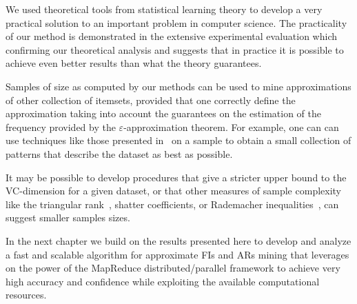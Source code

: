 We used theoretical tools from statistical learning theory to develop a very
practical solution to an important problem in computer science. The practicality
of our method is demonstrated in the extensive experimental evaluation which
confirming our theoretical analysis and suggests that in practice it is possible
to achieve even better results than what the theory guarantees. 

Samples of size as computed by our methods can be used to mine approximations
of other collection of itemsets, provided that one correctly define the
approximation taking into account the guarantees on the estimation of the
frequency provided by the $\varepsilon$-approximation theorem. For example, one
can can use techniques like those presented in~\citep{MampaeyTV11} on a sample
to obtain a small collection of patterns that describe the dataset as best as
possible.


It may be possible to develop procedures that give a stricter upper bound to the
VC-dimension for a given dataset, or that other measures of sample complexity
like the triangular rank~\citep{NewmanR12}, shatter coefficients, or Rademacher
inequalities~\citep{BoucheronBL05}, can suggest smaller samples sizes. 

In the next chapter we build on the results presented here to develop and
analyze a fast and scalable algorithm for approximate FIs and ARs mining that
leverages on the power of the MapReduce distributed/parallel framework to
achieve very high accuracy and confidence while exploiting the available
computational resources.

